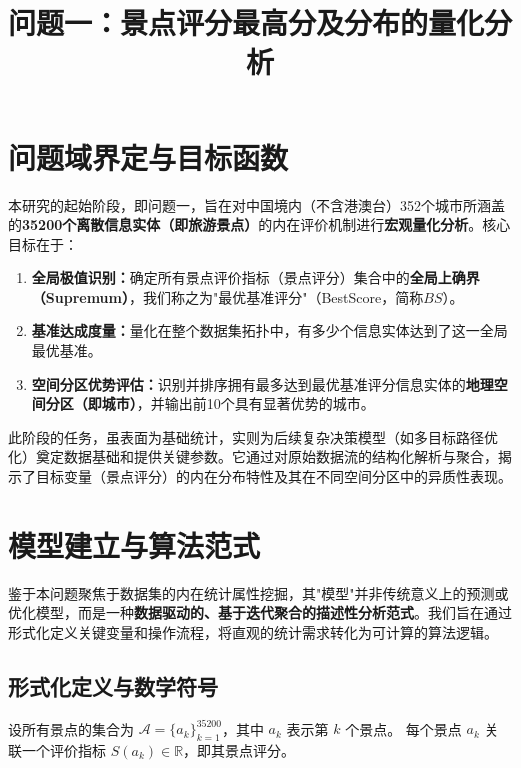 \documentclass[12pt]{article}
\title{问题一：景点评分最高分及分布的量化分析}
\author{}
\date{}
\begin{document}
\maketitle

\section{问题域界定与目标函数}

本研究的起始阶段，即问题一，旨在对中国境内（不含港澳台）352个城市所涵盖的\textbf{35200个离散信息实体（即旅游景点）}的内在评价机制进行\textbf{宏观量化分析}。核心目标在于：

\begin{enumerate}
    \item \textbf{全局极值识别：}确定所有景点评价指标（景点评分）集合中的\textbf{全局上确界（Supremum）}，我们称之为"最优基准评分"（BestScore，简称$BS$）。
    \item \textbf{基准达成度量：}量化在整个数据集拓扑中，有多少个信息实体达到了这一全局最优基准。
    \item \textbf{空间分区优势评估：}识别并排序拥有最多达到最优基准评分信息实体的\textbf{地理空间分区（即城市）}，并输出前10个具有显著优势的城市。
\end{enumerate}

此阶段的任务，虽表面为基础统计，实则为后续复杂决策模型（如多目标路径优化）奠定数据基础和提供关键参数。它通过对原始数据流的结构化解析与聚合，揭示了目标变量（景点评分）的内在分布特性及其在不同空间分区中的异质性表现。

\section{模型建立与算法范式}

鉴于本问题聚焦于数据集的内在统计属性挖掘，其"模型"并非传统意义上的预测或优化模型，而是一种\textbf{数据驱动的、基于迭代聚合的描述性分析范式}。我们旨在通过形式化定义关键变量和操作流程，将直观的统计需求转化为可计算的算法逻辑。

\subsection{形式化定义与数学符号}

设所有景点的集合为 $\mathcal{A} = \{a_k\}_{k=1}^{35200}$，其中 $a_k$ 表示第 $k$ 个景点。
每个景点 $a_k$ 关联一个评价指标 $S(a_k) \in \mathbb{R}$，即其景点评分。
\end{document}

